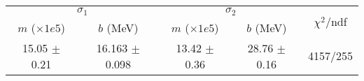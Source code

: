 \begin{tabular}{cc|cc||c}
\multicolumn{2}{c|}{$\sigma_1$} & \multicolumn{2}{|c}{$\sigma_2$}  & \multirow{2}{*}{$\chi^2/$ndf}\\
$m$ ($\times1e5$) & $b$ (MeV) & $m$ ($\times1e5$) & $b$ (MeV)  & \\
\hline
15.05 $\pm$ 0.21 & 16.163 $\pm$ 0.098 & 13.42 $\pm$ 0.36 & 28.76 $\pm$ 0.16 & 4157/255\\
\end{tabular}
